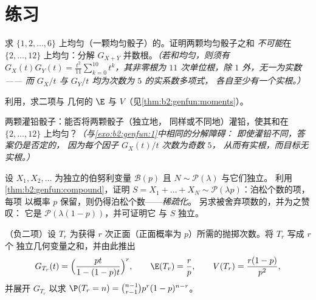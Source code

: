 \section{练习}

\begin{exercise}[$\star$]\label{exo:b2:genfun:1}
求 $\{1, 2,
\dots, 6\}$ 上均匀（一颗均匀骰子）的。证明两颗均匀骰子之和
\emph{不可能}在 $\{2, \dots, 12\}$ 上均匀：分解 $G_{X+Y}$
并数根。\emph{（若和均匀，则须有 $G_X(t)G_Y(t) =
\frac{t^2}{11}\sum_{k=0}^{10}t^k$，其非零根为
$11$ 次单位根，除 $1$ 外，无一为实数——
而 $G_X/t$ 与 $G_Y/t$ 均为次数为 $5$ 的实系数多项式，
各自至少有一个实根。）}
\end{exercise}

\begin{exercise}[$\star$]\label{exo:b2:genfun:2}
利用，求二项与
几何的 $\E$ 与 $V$（见\cref{thm:b2:genfun:moments}）。
\end{exercise}

\begin{exercise}[$\star$]\label{exo:b2:genfun:3}
两颗灌铅骰子：能否将两颗骰子（独立地，
同样或不同地）灌铅，使其和在 $\{2, \dots,
12\}$ 上均匀？\emph{（与\cref{exo:b2:genfun:1}中相同的分解障碍：
即使灌铅不同，答案仍是否定的，
因为每个因子 $G_X(t)/t$ 次数为奇数 $5$，
从而有实根，而目标无实根。）}
\end{exercise}

\begin{exercise}[$\star\star$]\label{exo:b2:genfun:4}
设 $X_1, X_2, \dots$ 为独立的伯努利变量 $\mathcal{B}(p)$
且 $N \sim \mathcal{P}(\lambda)$ 与它们独立。
利用\cref{thm:b2:genfun:compound}，证明 $S = X_1 + \dots + X_N
\sim \mathcal{P}(\lambda p)$：泊松个数的项，每项
以概率 $p$ 保留，则仍得泊松个数——\emph{稀疏化}。
另求被舍弃项数的，并为之赞叹：
它是 $\mathcal{P}(\lambda(1-p))$，并可证明它
与 $S$ 独立。
\end{exercise}

\begin{exercise}[$\star\star$]\label{exo:b2:genfun:5}
（负二项）设 $T_r$ 为获得
$r$ 次正面（正面概率为 $p$）所需的抛掷次数。将 $T_r$ 写成 $r$ 个
独立几何变量之和，并由此推出
\[
G_{T_r}(t) = \Bigl(\frac{pt}{1 - (1-p)t}\Bigr)^{r},
\qquad
\E(T_r) = \frac rp,
\qquad
V(T_r) = \frac{r(1-p)}{p^2},
\]
并展开 $G_{T_r}$ 以求 $\P(T_r = n) = \binom{n-1}{r-1}
p^r(1-p)^{n-r}$。
\end{exercise}

